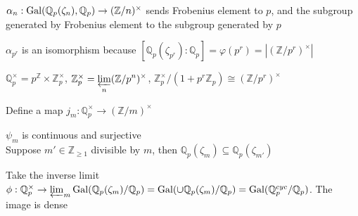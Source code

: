 \documentclass[main]{subfiles}
\begin{document}
$\alpha_n:\operatorname{Gal}(\mathbb Q_p(\zeta_n),\mathbb Q_p)\to(\mathbb Z/n)^\times$ sends Frobenius element to $p$, and the subgroup generated by Frobenius element to the subgroup generated by $p$

$\alpha_{p^r}$ is an isomorphism because $[\mathbb Q_p(\zeta_{p^r}):\mathbb Q_p]=\varphi(p^r)=|(\mathbb Z/p^r)^\times|$

$\mathbb Q_p^\times=p^{\mathbb Z}\times\mathbb Z_p^\times$, $\mathbb Z_p^\times=\displaystyle\varprojlim_n(\mathbb Z/p^n)^\times$, $\mathbb Z_p^\times/(1+p^r\mathbb Z_p)\cong(\mathbb Z/p^r)^\times$

Define a map $j_m:\mathbb Q_p^\times\to (\mathbb Z/m)^\times$
\begin{center}
\end{center}
\begin{center}
\end{center}
$\psi_m$ is continuous and surjective \\
Suppose $m'\in \mathbb Z_{\geq1}$ divisible by $m$, then $\mathbb Q_p(\zeta_m)\subseteq \mathbb Q_p(\zeta_{m'})$
\begin{center}
\end{center}
Take the inverse limit $\phi:\mathbb Q_p^\times\to\varprojlim_m\operatorname{Gal}(\mathbb Q_p(\zeta_m)/\mathbb Q_p)=\operatorname{Gal}(\cup \mathbb Q_p(\zeta_m)/\mathbb Q_p)=\operatorname{Gal}(\mathbb Q_p^{cyc}/\mathbb Q_p)$. The image is dense
\end{document}
